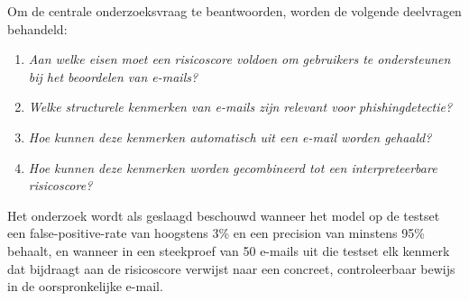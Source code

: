 Om de centrale onderzoeksvraag te beantwoorden, worden de volgende deelvragen behandeld:

\begin{enumerate}
  \item \emph{Aan welke eisen moet een risicoscore voldoen om gebruikers te ondersteunen bij het beoordelen van e-mails?}
  \item \emph{Welke structurele kenmerken van e-mails zijn relevant voor phishingdetectie?}
  \item \emph{Hoe kunnen deze kenmerken automatisch uit een e-mail worden gehaald?}
  \item \emph{Hoe kunnen deze kenmerken worden gecombineerd tot een interpreteerbare risicoscore?}
\end{enumerate}

Het onderzoek wordt als geslaagd beschouwd wanneer het model op de testset een false-positive-rate van hoogstens 3\% en een precision van minstens 95\% behaalt, en wanneer in een steekproef van 50 e-mails uit die testset elk kenmerk dat bijdraagt aan de risicoscore verwijst naar een concreet, controleerbaar bewijs in de oorspronkelijke e-mail.
